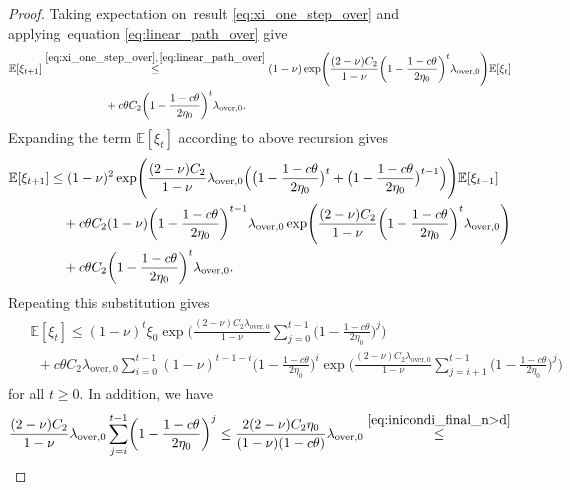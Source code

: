 \documentclass[11pt]{article}
\theoremstyle{plain}
\theoremstyle{definition}
\theoremstyle{remark}
\theoremstyle{plain}
\begin{document}
\begin{proof}
Taking expectation on~result \eqref{eq:xi_one_step_over} and applying~equation \eqref{eq:linear_path_over} give
\begin{align}
    \label{eq:xi_t+1_recur_xi_t}
    \begin{split}
\mathbb E[\xi_{t+1}]
&\overset{\eqref{eq:xi_one_step_over},\,\eqref{eq:linear_path_over}}{\leq}
(1-\nu)
\exp\Biggl(\frac{(2-\nu)C_2}{1-\nu}
\biggl(1-\frac{1-c\theta}{2\eta_0}\biggr)^t
\lambda_{\mathrm{over},0}\Biggr)\mathbb E[\xi_t]
\\
&~~~~~~~~~~~~~~~~~+c\theta C_2\biggl(1-\frac{1-c\theta}{2\eta_0}\biggr)^t
\lambda_{\mathrm{over},0}.
    \end{split}
\end{align}
Expanding the term $\mathbb E[\xi_t]$ according to above recursion gives
\begin{align*}
\mathbb E[\xi_{t+1}]
&\leq(1-\nu)^2
\exp\Biggl(\frac{(2-\nu)C_2}{1-\nu}\lambda_{\mathrm{over},0}
\Bigl(\bigl(1-\frac{1-c\theta}{2\eta_0}\bigr)^t
+\bigl(1-\frac{1-c\theta}{2\eta_0}\bigr)^{t-1}\Bigr)\Biggr)
\mathbb E[\xi_{t-1}]\\
&\quad+c\theta C_2(1-\nu)
\biggl(1-\frac{1-c\theta}{2\eta_0}\biggr)^{t-1}
\lambda_{\mathrm{over},0}
\exp\Biggl(\frac{(2-\nu)C_2}{1-\nu}
\biggl(1-\frac{1-c\theta}{2\eta_0}\biggr)^t
\lambda_{\mathrm{over},0}\Biggr)\\
&\quad+c\theta C_2\biggl(1-\frac{1-c\theta}{2\eta_0}\biggr)^t
\lambda_{\mathrm{over},0}.
\end{align*}
Repeating this substitution gives
\begingroup
\small
\begin{align}\label{eq:finialxi_t_recur}
\begin{split}
&\!\!\!\mathbb E[\xi_t]
\leq(1-\nu)^t\xi_0
\exp\Biggl(\frac{(2-\nu)C_2\lambda_{\mathrm{over},0}}{1-\nu}
\sum_{j=0}^{t-1}\biggl(1-\frac{1-c\theta}{2\eta_0}\biggr)^j\Biggr)\\
&~~+c\theta C_2\lambda_{\mathrm{over},0}
\sum_{i=0}^{t-1}(1-\nu)^{t-1-i}
\biggl(1-\frac{1-c\theta}{2\eta_0}\biggr)^i
\exp\Biggl(\frac{(2-\nu)C_2\lambda_{\mathrm{over},0}}{1-\nu}
\sum_{j=i+1}^{t-1}\biggl(1-\frac{1-c\theta}{2\eta_0}\biggr)^j\Biggr)
    \end{split}
\end{align}
\endgroup
for all $t\geq0$.
In addition, we have
\begin{align*}
\frac{(2-\nu)C_2}{1-\nu}
\lambda_{\mathrm{over},0}
\sum_{j=i}^{t-1}\biggl(1-\frac{1-c\theta}{2\eta_0}\biggr)^j
\leq\frac{2(2-\nu)C_2\eta_0}{(1-\nu)(1-c\theta)}
\lambda_{\mathrm{over},0}\overset{\eqref{eq:inicondi_final_n>d}}{\leq}

\end{align*}
\end{proof}
\end{document}
